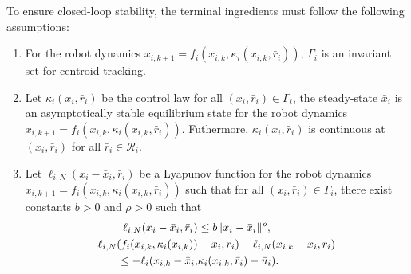 To ensure closed-loop stability, the terminal ingredients must follow the following assumptions:
\begin{assumption}
\label{ass:terminal}
\begin{enumerate}
    \item For the robot dynamics $x_{i,k+1}=f_i(x_{i,k}, \kappa_i(x_{i,k}, \bar{r}_i))$, $\Gamma_i$ is an invariant set for centroid tracking.
    \item Let $\kappa_i(x_{i}, \bar{r}_i)$ be the control law for all $(x_{i}, \bar{r}_i) \in \Gamma_i$, the steady-state $\bar{x}_i$ is an asymptotically stable equilibrium state for the robot dynamics $x_{i,k+1}=f_i(x_{i,k}, \kappa_i(x_{i,k}, \bar{r}_i))$. Futhermore, $\kappa_i(x_i, \bar{r}_i)$ is continuous at $(x_i, \bar{r}_i)$ for all $\bar{r}_i \in \mathcal{R}_i$.
    \item Let $\ell_{i,N}(x_{i} - \bar{x}_i, \bar{r}_i)$ be a Lyapunov function for the robot dynamics $x_{i,k+1}=f_i(x_{i,k}, \kappa_i(x_{i,k}, \bar{r}_i))$ such that for all $(x_i, \bar{r}_i) \in \Gamma_i$, there exist constants $b>0$ and $\rho >0$ such that
    \begin{align}
    \label{eq:terminal_lyap_1}
        \ell_{i,N}(x_{i} - \bar{x}_i, \bar{r}_i) &\leq b\lVert x_i - \bar{x}_i\rVert^\rho,\\
        \ell_{i,N}(f_i(x_{i,k}, \kappa_i(x_{i,k}))& - \bar{x}_i, \bar{r}_i) -  \ell_{i,N}(x_{i,k}-\bar{x}_i, \bar{r}_i)\nonumber \\
        \label{eq:terminal_lyap_2}
        \leq -\ell_{i}(x_{i,k}-\bar{x}_i, &\kappa_i(x_{i,k}, \bar{r}_i) - \bar{u}_{i}).
    \end{align}
\end{enumerate}
\end{assumption}

